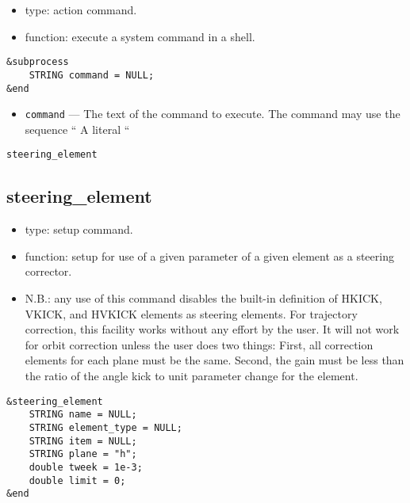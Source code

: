 \documentclass[11pt]{article}
\begin{document}
\begin{itemize}
\item type: action command.
\item function: execute a system command in a shell.
\end{itemize}

\begin{verbatim}
&subprocess 
    STRING command = NULL;
&end
\end{verbatim}

\begin{itemize}
\item \verb|command| --- The text of the command to execute.  The command may
use the sequence ``%
A literal ``%
\end{itemize}

\begin{latexonly}
\newpage
\begin{center}{\Large\verb|steering_element|}\end{center}
\end{latexonly}
\subsection{steering\_element}

\begin{itemize}
\item type: setup command.
\item function: setup for use of a given parameter of a given element as a steering corrector.
\item N.B.: any use of this command disables the built-in definition of HKICK, VKICK, and HVKICK elements
as steering elements.  For trajectory correction, this facility works without any effort by the user.
It will not work for orbit correction unless the user does two things: First, all correction elements
for each plane must be the same.  Second, the gain must be less than the ratio of the angle kick to
unit parameter change for the element.
\end{itemize}

\begin{verbatim}
&steering_element
    STRING name = NULL;
    STRING element_type = NULL;
    STRING item = NULL;
    STRING plane = "h";
    double tweek = 1e-3;
    double limit = 0;
&end
\end{verbatim}
\end{document}
